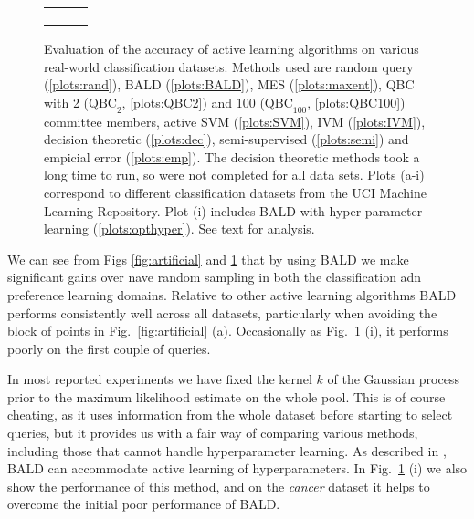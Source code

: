 \begin{figure}
	\begin{center}
	\begin{tabular}{ccc}
	&
	&
	\\
	&
	&
	\\
	&
	&
	
	\end{tabular}
	\end{center}
	\caption[Evaluation of Bayesian active learning on real-world data sets]{Evaluation of the accuracy of active learning algorithms on various real-world classification datasets. Methods used are random query (\ref{plots:rand}), BALD (\ref{plots:BALD}),  MES (\ref{plots:maxent}), QBC with 2 ($\mbox{QBC}_2$, \ref{plots:QBC2}) and 100 ($\mbox{QBC}_{100}$, \ref{plots:QBC100}) committee members, active SVM (\ref{plots:SVM}), IVM (\ref{plots:IVM}), decision theoretic \citep{Kapoor2007} (\ref{plots:dec}), semi-supervised \citep{Zhu2003} (\ref{plots:semi}) and empicial error (\ref{plots:emp}). The decision theoretic methods took a long time to run, so were not completed for all data sets. Plots (a-i) correspond to different classification datasets from the UCI Machine Learning Repository. Plot (i) includes BALD with hyper-parameter learning (\ref{plots:opthyper}). See text for analysis. \label{fig:BALD_GPC_results}}
\end{figure}

We can see from Figs \ref{fig:artificial} and \ref{fig:BALD_GPC_results} that by using BALD we make significant gains over nave random sampling in both the classification adn preference learning domains. Relative to other active learning algorithms BALD performs consistently well across all datasets, particularly when avoiding the block of points in Fig.\ \ref{fig:artificial} (a). Occasionally \eg as Fig.\ \ref{fig:BALD_GPC_results} (i), it performs poorly on the first couple of queries.

In most reported experiments we have fixed the kernel $k$ of the Gaussian process prior to the maximum likelihood estimate on the whole pool. This is of course cheating, as it uses information from the whole dataset before starting to select queries, but it provides us with a fair way of comparing various methods, including those that cannot handle hyperparameter learning. As described in \citep{Houlsby2011,Houlsby2012preference}, BALD can accommodate active learning of hyperparameters. In Fig.\ \ref{fig:BALD_GPC_results} (i) we also show the performance of this method, and on the \emph{cancer} dataset it helps to overcome the initial poor performance of BALD.

